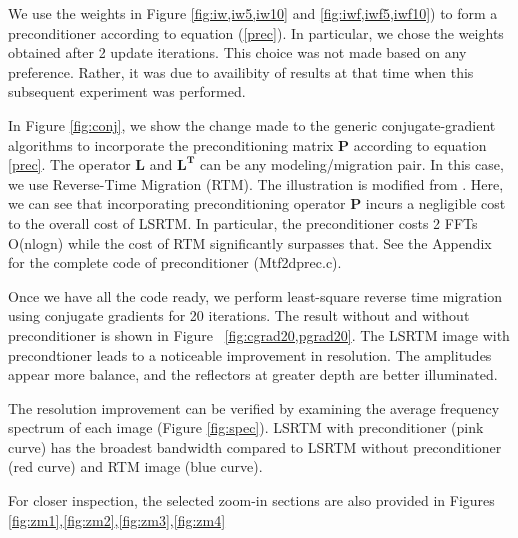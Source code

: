 We use the weights in Figure \ref{fig:iw,iw5,iw10} and \ref{fig:iwf,iwf5,iwf10}) to form a preconditioner according to equation (\ref{prec}). In particular, we chose the weights obtained after 2 update iterations. This choice was not made based on any preference. Rather, it was due to availibity of results at that time when this subsequent experiment was performed.

In Figure \ref{fig:conj}, we show the change made to the generic conjugate-gradient algorithms to incorporate the preconditioning matrix $\mathbf{P}$ according to equation \ref{prec}. The operator $\mathbf{L}$ and $\mathbf{L^T}$ can be any modeling/migration pair. In this case, we use Reverse-Time Migration (RTM). The illustration is modified from \cite[]{madagascar}. Here, we can see that incorporating preconditioning operator $\mathbf{P}$ incurs a negligible cost to the overall cost of LSRTM. In particular, the preconditioner costs 2 FFTs O(nlogn) while the cost of RTM significantly surpasses that. See the Appendix for the complete code of preconditioner (Mtf2dprec.c).


Once we have all the code ready, we perform least-square reverse time migration using conjugate gradients for 20 iterations. The result without and without preconditioner is shown in Figure ~\ref{fig:cgrad20,pgrad20}. The LSRTM image with precondtioner leads to a noticeable improvement in resolution. The amplitudes appear more balance, and the reflectors at greater depth are better illuminated. 


%

The resolution improvement can be verified by examining the average frequency spectrum of each image (Figure \ref{fig:spec}). LSRTM with preconditioner (pink curve) has the broadest bandwidth compared to LSRTM without preconditioner (red curve) and RTM image (blue curve). 



%

For closer inspection, the selected zoom-in sections are also provided in Figures \ref{fig:zm1},\ref{fig:zm2},\ref{fig:zm3},\ref{fig:zm4}

